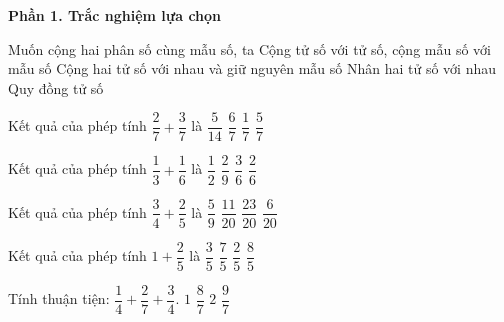 \textbf{Phần 1. Trắc nghiệm lựa chọn}

\begin{ex} %
Muốn cộng hai phân số cùng mẫu số, ta
\choice
{Cộng tử số với tử số, cộng mẫu số với mẫu số}
{\True Cộng hai tử số với nhau và giữ nguyên mẫu số}
{Nhân hai tử số với nhau}
{Quy đồng tử số}
\end{ex}

\begin{ex} %
Kết quả của phép tính $\dfrac{2}{7} + \dfrac{3}{7}$ là
\choice
{$\dfrac{5}{14}$}
{$\dfrac{6}{7}$}
{$\dfrac{1}{7}$}
{\True $\dfrac{5}{7}$}
\end{ex}

\begin{ex} %
Kết quả của phép tính $\dfrac{1}{3} + \dfrac{1}{6}$ là
\choice
{\True $\dfrac{1}{2}$}
{$\dfrac{2}{9}$}
{$\dfrac{3}{6}$}
{$\dfrac{2}{6}$}
\end{ex}

\begin{ex} %
Kết quả của phép tính $\dfrac{3}{4} + \dfrac{2}{5}$ là
\choice
{$\dfrac{5}{9}$}
{$\dfrac{11}{20}$}
{\True $\dfrac{23}{20}$}
{$\dfrac{6}{20}$}
\end{ex}

\begin{ex} %
Kết quả của phép tính $1 + \dfrac{2}{5}$ là
\choice
{$\dfrac{3}{5}$}
{\True $\dfrac{7}{5}$}
{$\dfrac{2}{5}$}
{$\dfrac{8}{5}$}
\end{ex}

\begin{ex} %
Tính thuận tiện: $\dfrac{1}{4} + \dfrac{2}{7} + \dfrac{3}{4}$.
\choice
{$1$}
{$\dfrac{8}{7}$}
{$2$}
{\True $\dfrac{9}{7}$}
\end{ex}

